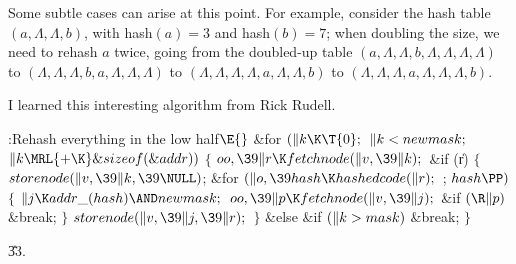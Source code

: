 Some subtle cases can arise at this point.
For example, consider the hash table
{\let\\=\Lambda $(a,\\,\\,b)$, with hash$(a)=3$ and hash$(b)=7$; when
doubling the size, we need to rehash $a$ twice, going from
the doubled-up table
$(a,\\,\\,b,\\,\\,\\,\\)$ to
$(\\,\\,\\,b,a,\\,\\,\\)$ to
$(\\,\\,\\,\\,a,\\,\\,b)$ to
$(\\,\\,\\,a,\\,\\,\\,b)$.}

I learned this interesting algorithm from Rick Rudell.

\Y\B\4:Rehash everything in the low half\X${}\E{}$\6
\&{for} ${}(\|k\K\T{0};{}$ ${}\|k<\\{newmask};{}$ ${}\|k\MRL{+{\K}}\&{sizeof}(%
\&{addr})){}$\5
${}\{{}$\1\6
${}\\{oo},\39\|r\K\\{fetchnode}(\|v,\39\|k);{}$\6
\&{if} (\|r)\5
${}\{{}$\1\6
${}\\{storenode}(\|v,\39\|k,\39\NULL){}$;\6
\&{for} ${}(\|o,\39\\{hash}\K\\{hashedcode}(\|r);{}$  ; ${}\\{hash}\PP){}$\5
${}\{{}$\1\6
${}\|j\K\\{addr\_}(\\{hash})\AND\\{newmask};{}$\6
${}\\{oo},\39\|p\K\\{fetchnode}(\|v,\39\|j);{}$\6
\&{if} ${}(\R\|p){}$\1\5
\&{break};\2\6
\4${}\}{}$\2\6
${}\\{storenode}(\|v,\39\|j,\39\|r);{}$\6
\4${}\}{}$\5
\2\&{else} \&{if} ${}(\|k>\\{mask}){}$\1\5
\&{break};\2\6
\4${}\}{}$\2\par
\U33.\fi

